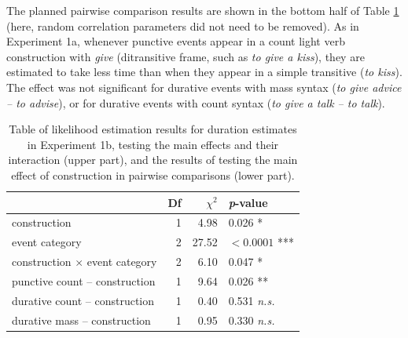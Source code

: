 \documentclass[review,12pt,authoryear]{elsarticle}
\begin{document}
The planned pairwise comparison results are shown in the bottom half of Table \ref{table_OE_BetwSubj} (here, random correlation parameters did not need to be removed). As in Experiment 1a, whenever punctive events appear in a count light verb construction with \emph{give} (ditransitive frame, such as\emph{ to give a kiss}), they are estimated to take less time than when they appear in a simple transitive (\emph{to kiss}). The effect was not significant for durative events with mass syntax (\emph{to give advice -- to advise}), or for durative events with count syntax (\emph{to give a talk -- to talk}).

\begin{table}[ht]
\centering
\begin{tabular}{lrrl}
 \hline
 & Df &  $\chi^2$ & \emph{p}-value \\ 
  \hline
construction          & 1 &  4.98 & 0.026 * \\ 
  event category          & 2 &  27.52 & $<0.0001$ ***\\ 
  construction $\times$ event category & 2 & 6.10 & 0.047 * \\    \hline
   punctive count -- construction    & 1 & 9.64 & 0.026 ** \\    
   durative count -- construction    & 1  & 0.40 & 0.531 \emph{n.s.}\\ 
   durative mass -- construction   & 1 &  0.95 & 0.330 \emph{n.s.} \\ \hline
\end{tabular}
\caption{Table of likelihood estimation results for duration estimates in Experiment 1b, testing the main effects and their interaction (upper part), and the results of testing the main effect of construction in pairwise comparisons (lower part).}
\label{table_OE_BetwSubj}
\end{table}
\end{document}

